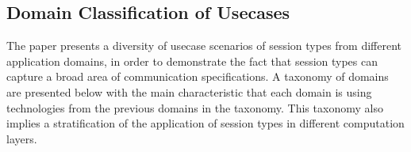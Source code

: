 \subsection{Domain Classification of Usecases}

The paper presents a diversity of usecase scenarios of
session types from different application domains, in order
to demonstrate the fact that session types can capture
a broad area of communication specifications.
A taxonomy of domains are presented below with the main
characteristic that each domain is using technologies from the
previous domains in the taxonomy. This taxonomy also implies
a stratification of the application of session types in different
computation layers.

